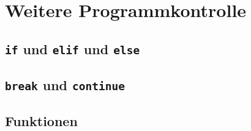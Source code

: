 \chapter{Weitere Programmkontrolle}

\section{\texttt{if} und \texttt{elif} und \texttt{else}}
\section{\texttt{break} und \texttt{continue} }
\section{Funktionen}
